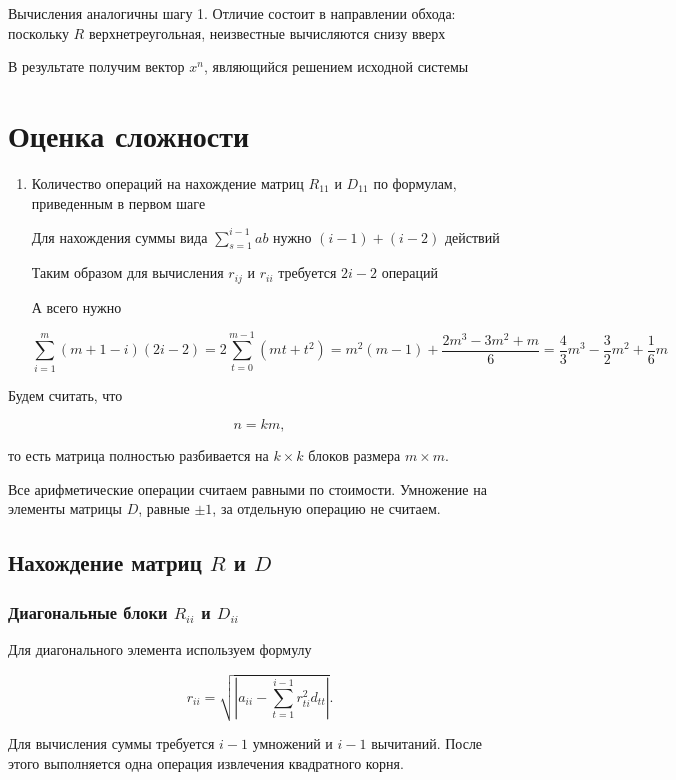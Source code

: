 \documentclass[a4paper,12pt]{article}
\begin{document}
Вычисления аналогичны шагу 1. Отличие состоит в направлении обхода:
поскольку $R$ верхнетреугольная, неизвестные вычисляются снизу вверх

В результате получим вектор $x^n$, являющийся решением исходной
системы

\section{Оценка сложности}

\begin{enumerate}
  \item Количество операций на нахождение матриц $R_{11}$ и $D_{11}$ по формулам, приведенным в первом шаге

  Для нахождения суммы вида $\sum_{s = 1}^{i - 1} a b$ нужно $(i - 1) + (i - 2)$ действий

  Таким образом для вычисления $r_{ij}$ и $r_{ii}$ требуется $2i - 2$ операций

  А всего нужно

  $$\sum_{i = 1}^{m} (m + 1 - i) (2i - 2) = 2\sum_{t = 0}^{m - 1} (mt + t^2) = m^2 (m - 1) + \frac{2m^3 - 3m^2 + m}{6} = \frac{4}{3} m^3 - \frac{3}{2} m^2 + \frac{1}{6} m$$
\end{enumerate}

Будем считать, что

$$
n=km,
$$

то есть матрица полностью разбивается на \(k\times k\) блоков размера \(m\times m\).

Все арифметические операции считаем равными по стоимости. Умножение на элементы матрицы \(D\), равные \(\pm1\), за отдельную операцию не считаем.

\subsection{Нахождение матриц \(R\) и \(D\)}

\subsubsection{Диагональные блоки \(R_{ii}\) и \(D_{ii}\)}

Для диагонального элемента используем формулу

$$
r_{ii}
=
\sqrt{
  \left|
  a_{ii}
  -
  \sum_{t=1}^{i-1}r_{ti}^{2}d_{tt}
  \right|
}.
$$

Для вычисления суммы требуется \(i-1\) умножений и \(i-1\) вычитаний. После этого выполняется одна операция извлечения квадратного корня.
\end{document}
